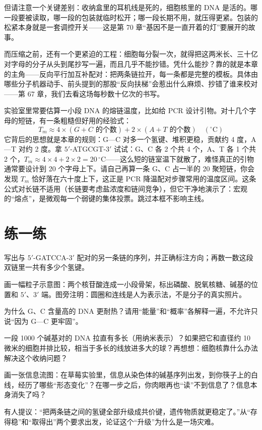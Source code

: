 但请注意一个关键差别：收纳盒里的耳机线是死的，细胞核里的 DNA 是活的。哪一段要被读取，哪一段的包装就临时松开；哪一段长期不用，就压得更紧。包装的松紧本身就是一套调控开关——这是第 70 章“基因不是一直开着的灯”要展开的故事。

而压缩之前，还有一个更紧迫的工程：细胞每分裂一次，就得把这两米长、三十亿对字母的分子从头到尾抄写一遍，而且几乎不能抄错。凭什么能抄？靠的就是本章的主角——反向平行加互补配对：把两条链拉开，每一条都是完整的模板。具体由哪些分子机器动手、前头提到的那股“反向扶梯”会惹出什么麻烦、抄错了谁来校对——第 67 章，我们去看这场每秒数十亿次的书写。

\begin{tiaozhan}
实验室里常要估算一小段 DNA 的熔链温度，比如给 PCR 设计引物。对十几个字母的短链，有一条粗糙但好用的经验式：
\[T_m \approx 4\times (G+C\text{ 的个数}) + 2\times (A+T\text{ 的个数}) \quad (^{\circ}\mathrm{C})\]
它背后的思想就是本章的规则：G—C 对多一个氢键、堆积更稳，贡献约 4 度，A—T 对约 2 度。拿 $5'$-ATGCGT-$3'$ 试试：G、C 各 2 个共 4 个，A、T 各 1 个共 2 个，$T_m\approx 4\times 4+2\times 2=20\,^{\circ}\mathrm{C}$——这么短的链室温下就散了，难怪真正的引物通常要设计到 20 个字母上下。请自己再算一条 G、C 占一半的 20 聚短链，你会发现 $T_m$ 恰好落在六十度上下，这正是 PCR 降温配对步骤常用的温度区间。这条公式对长链不适用（长链要考虑盐浓度和链间竞争），但它干净地演示了：宏观的“熔点”，是微观每一个弱键的集体投票。跳过本框不影响主线。
\end{tiaozhan}

\section*{练一练}

\begin{sikaoti}
\item 写出与 $5'$-GATCCA-$3'$ 配对的另一条链的序列，并正确标注方向；再数一数这段双链里一共有多少个氢键。
\item 画一幅粒子示意图：两个核苷酸连成一小段骨架，标出磷酸、脱氧核糖、碱基的位置和 $5'$、$3'$ 端。图旁注明：圆圈和连线是人为表示法，不是分子的真实照片。
\item 为什么 G、C 含量高的 DNA 更耐热？请用“能量”和“概率”各解释一遍，不允许只说“因为 G—C 更牢固”。
\item 一段 1000 个碱基对的 DNA 拉直有多长（用纳米表示）？如果把它和直径约 10 微米的细胞并排比较，相当于多长的线放进多大的球？再想想：细胞核靠什么办法解决这个收纳问题？
\item 画一张信息流图：在草莓实验里，信息从染色体的碱基序列出发，到你筷子上的白线，经历了哪些“形态变化”？在哪一步之后，你肉眼再也“读”不到信息了？信息本身消失了吗？
\item 有人提议：“把两条链之间的氢键全部升级成共价键，遗传物质就更稳定了。”从“存得稳”和“取得出”两个要求出发，论证这个“升级”为什么是一场灾难。
\end{sikaoti}
